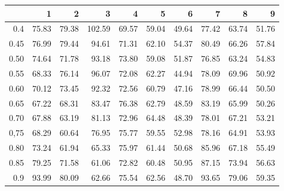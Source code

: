 \begin{table}[ht]
\centering
\begin{tabular}{rrrrrrrrrr}
  \hline
 & 1 & 2 & 3 & 4 & 5 & 6 & 7 & 8 & 9 \\ 
  \hline
0.4 & 75.83 & 79.38 & 102.59 & 69.57 & 59.04 & 49.64 & 77.42 & 63.74 & 51.76 \\ 
  0.45 & 76.99 & 79.44 & 94.61 & 71.31 & 62.10 & 54.37 & 80.49 & 66.26 & 57.84 \\ 
  0.50 & 74.64 & 71.78 & 93.18 & 73.80 & 59.08 & 51.87 & 76.85 & 63.24 & 54.83 \\ 
  0.55 & 68.33 & 76.14 & 96.07 & 72.08 & 62.27 & 44.94 & 78.09 & 69.96 & 50.92 \\ 
  0.60 & 70.12 & 73.45 & 92.32 & 72.56 & 60.79 & 47.16 & 78.99 & 66.44 & 50.50 \\ 
  0.65 & 67.22 & 68.31 & 83.47 & 76.38 & 62.79 & 48.59 & 83.19 & 65.99 & 50.26 \\ 
  0.70 & 67.88 & 63.19 & 81.13 & 72.96 & 64.48 & 48.39 & 78.01 & 67.21 & 53.21 \\ 
  0,75 & 68.29 & 60.64 & 76.95 & 75.77 & 59.55 & 52.98 & 78.16 & 64.91 & 53.93 \\ 
  0.80 & 73.24 & 61.94 & 65.33 & 75.97 & 61.44 & 50.68 & 85.96 & 67.18 & 55.49 \\ 
  0.85 & 79.25 & 71.58 & 61.06 & 72.82 & 60.48 & 50.95 & 87.15 & 73.94 & 56.63 \\ 
  0.9 & 93.99 & 80.09 & 62.66 & 75.54 & 62.56 & 48.70 & 93.65 & 79.06 & 59.35 \\ 
   \hline
\end{tabular}
\end{table}
